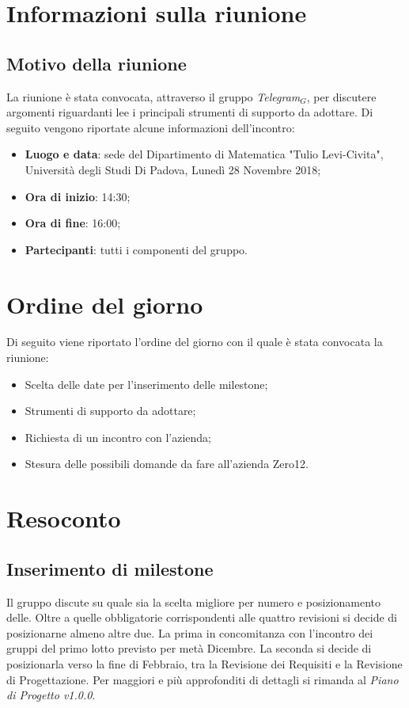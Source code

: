 \documentclass[a4paper,12pt]{article}
\begin{document}
	\cleardoublepage
	\pagestyle{mymain}
	
	\tableofcontents
	\cleardoublepage
	
	\section{Informazioni sulla riunione}
	\subsection{Motivo della riunione}
	La riunione è stata convocata, attraverso il gruppo \textit{Telegram$_{G}$}, per discutere argomenti riguardanti lee i principali strumenti di supporto da adottare.
	Di seguito vengono riportate alcune informazioni dell'incontro:
	\begin{itemize}
		\item \textbf{Luogo e data}: sede del Dipartimento di Matematica "Tulio Levi-Civita", Università degli Studi Di Padova, Lunedì 28 Novembre 2018;
		\item \textbf{Ora di inizio}: 14:30;
		\item \textbf{Ora di fine}: 16:00;
		\item \textbf{Partecipanti}: tutti i componenti del gruppo.
	\end{itemize}
	\section{Ordine del giorno}
	Di seguito viene riportato l'ordine del giorno con il quale è stata convocata la riunione:
	\begin{itemize}
		\item Scelta delle date per l'inserimento delle milestone;
		\item Strumenti di supporto da adottare;
		\item Richiesta di un incontro con l'azienda;
		\item Stesura delle possibili domande da fare all'azienda Zero12.
	\end{itemize}
	\section{Resoconto}
	\subsection{Inserimento di milestone}
	Il gruppo discute su quale sia la scelta migliore per numero e posizionamento delle. Oltre a quelle obbligatorie corrispondenti alle quattro revisioni si decide di posizionarne almeno altre due. La prima in concomitanza con l'incontro dei gruppi del primo lotto previsto per metà Dicembre. La seconda si decide di posizionarla verso la fine di Febbraio, tra la Revisione dei Requisiti e la Revisione di Progettazione. Per maggiori e più approfonditi di dettagli si rimanda al \textit{Piano di Progetto v1.0.0}.
\end{document}
